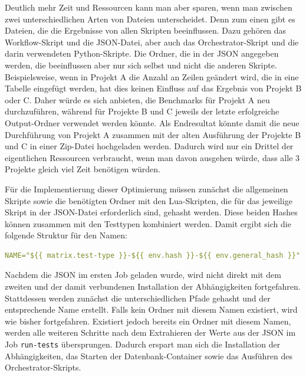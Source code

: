 %

Deutlich mehr Zeit und Ressourcen kann man aber sparen, wenn man zwischen zwei unterschiedlichen Arten von Dateien unterscheidet.
Denn zum einen gibt es Dateien, die die Ergebnisse von allen Skripten beeinflussen.
Dazu gehören das Workflow-Skript und die JSON-Datei, aber auch das Orchestrator-Skript und die darin verwendeten Python-Skripte.
Die Ordner, die in der JSON angegeben werden, die beeinflussen aber nur sich selbst und nicht die anderen Skripte.
Beispielsweise, wenn in Projekt A die Anzahl an Zeilen geändert wird, die in eine Tabelle eingefügt werden, hat dies keinen Einfluss auf das Ergebnis von Projekt B oder C\@.
Daher würde es sich anbieten, die Benchmarks für Projekt A neu durchzuführen, während für Projekte B und C jeweils der letzte erfolgreiche Output-Ordner verwendet werden könnte.
Als Endresultat könnte damit die neue Durchführung von Projekt A zusammen mit der alten Ausführung der Projekte B und C in einer Zip-Datei hochgeladen werden.
Dadurch wird nur ein Drittel der eigentlichen Ressourcen verbraucht, wenn man davon ausgehen würde, dass alle 3 Projekte gleich viel Zeit benötigen würden.

Für die Implementierung dieser Optimierung müssen zunächst die allgemeinen Skripte sowie die benötigten Ordner mit den Lua-Skripten, die für das jeweilige Skript in der JSON-Datei erforderlich sind, gehasht werden.
Diese beiden Hashes können zusammen mit den Testtypen kombiniert werden.
Damit ergibt sich die folgende Struktur für den Namen:

\vspace{-5pt}
\begin{lstlisting}[language=yaml,label={lst:tools-hash_name},style=custom_daniel]
NAME="${{ matrix.test-type }}-${{ env.hash }}-${{ env.general_hash }}"
\end{lstlisting}
\vspace{-5pt}

Nachdem die JSON im ersten Job geladen wurde, wird nicht direkt mit dem zweiten und der damit verbundenen Installation der Abhängigkeiten fortgefahren.
Stattdessen werden zunächst die unterschiedlichen Pfade gehasht und der entsprechende Name erstellt.
Falls kein Ordner mit diesem Namen existiert, wird wie bisher fortgefahren.
Existiert jedoch bereits ein Ordner mit diesem Namen, werden alle weiteren Schritte nach dem Extrahieren der Werte aus der JSON im Job \texttt{run-tests} übersprungen.
Dadurch erspart man sich die Installation der Abhängigkeiten, das Starten der Datenbank-Container sowie das Ausführen des Orchestrator-Skripts.

